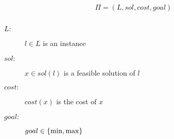 
\begin{frame}

  \begin{definition}
	\[
	  \Pi = (L, sol, cost, goal)
	\]

	\pause
	\begin{columns}
		\begin{description}
		  \item[$L:$] $l \in L$ is an instance \\ 
		  \item[$sol:$] $x \in sol(l)$ is a feasible solution of $l$ \\ 
		  \item[$cost:$] $cost(x)$ is the cost of $x$ \\
		  \item[$goal:$] $goal \in \left\{ \min, \max \right\}$
		\end{description}
	\end{columns}
  \end{definition}

\end{frame}

